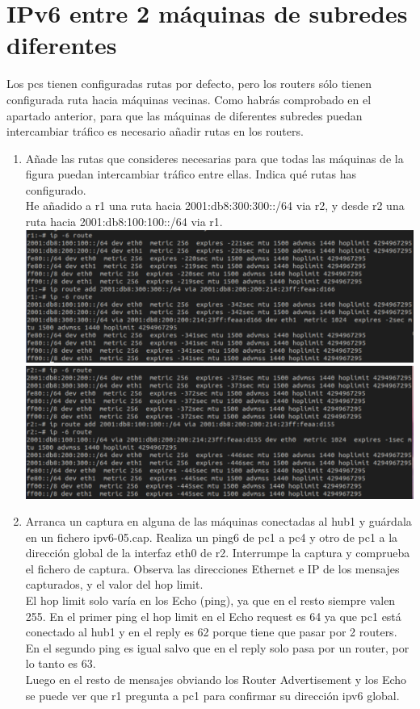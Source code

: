 \documentclass[12pt, a4paper]{report}
\begin{document}
\section{IPv6 entre 2 máquinas de subredes diferentes}
Los pcs tienen configuradas rutas por defecto, pero los routers sólo tienen configurada ruta hacia
máquinas vecinas. Como habrás comprobado en el apartado anterior, para que las máquinas de
diferentes subredes puedan intercambiar tráfico es necesario añadir rutas en los routers.
\begin{enumerate}
	\item Añade las rutas que consideres necesarias para que todas las máquinas de la figura puedan
	intercambiar tráfico entre ellas. Indica qué rutas has configurado.\\
	He añadido a r1 una ruta hacia 2001:db8:300:300::/64 via r2, y desde r2 una ruta hacia 2001:db8:100:100::/64 via r1.\\
	\includegraphics[width=1\textwidth]{ej1_1_2}
	\includegraphics[width=1\textwidth]{ej1_2_2}
	\item Arranca un captura en alguna de las máquinas conectadas al hub1 y guárdala en un fichero
	ipv6-05.cap. Realiza un ping6 de pc1 a pc4 y otro de pc1 a la dirección global de la interfaz
	eth0 de r2. Interrumpe la captura y comprueba el fichero de captura. Observa las direcciones
	Ethernet e IP de los mensajes capturados, y el valor del hop limit.\\
	
	El hop limit solo varía en los Echo (ping), ya que en el resto siempre valen 255. En el primer ping el hop limit en el Echo request es 64 ya que pc1 está conectado al hub1 y en el reply es 62 porque tiene que pasar por 2 routers. En el segundo ping es igual salvo que en el reply solo pasa por un router, por lo tanto es 63.\\
	
	Luego en el resto de mensajes obviando los Router Advertisement y los Echo se puede ver que r1 pregunta a pc1 para confirmar su dirección ipv6 global.
	
\end{enumerate}
\end{document}
